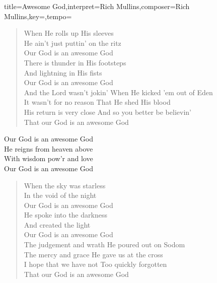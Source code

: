\documentclass{leadsheet}
\begin{document}
\begin{song}{title={Awesome God},interpret={Rich Mullins},composer={Rich Mullins},key={},tempo={}}

\begin{schedule}
\end{schedule}

\begin{intro}
\end{intro}

\begin{verse}
When He rolls up His sleeves \\
He ain't just puttin' on the ritz \\
Our God is an awesome God \\
There is thunder in His footsteps \\
And lightning in His fists \\
Our God is an awesome God \\
And the Lord wasn't jokin' When He kicked 'em out of Eden \\
It wasn't for no reason That He shed His blood \\
His return is very close And so you better be believin' \\
That our God is an awesome God
\end{verse}

\begin{chorus}
Our God is an awesome God \\
He reigns from heaven above \\
With wisdom pow'r and love \\
Our God is an awesome God
\end{chorus}

\begin{verse}
When the sky was starless \\
In the void of the night \\
Our God is an awesome God \\
He spoke into the darkness \\
And created the light \\
Our God is an awesome God \\
The judgement and wrath He poured out on Sodom \\
The mercy and grace He gave us at the cross \\
I hope that we have not Too quickly forgotten \\
That our God is an awesome God
\end{verse}

\end{song}
\end{document}
